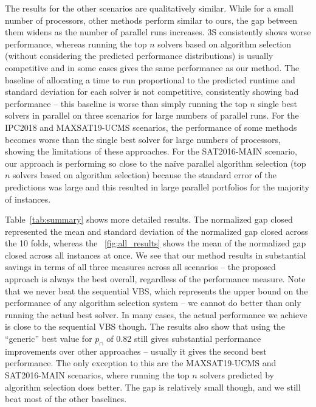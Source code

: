 The results for the other scenarios are qualitatively similar. While for a small number of processors, other methods perform similar to ours, the gap between them widens as the number of parallel runs increases. 3S consistently shows worse performance, whereas running the top $n$ solvers based on algorithm selection (without considering the predicted performance distributions) is usually competitive and in some cases gives the same performance as our method. The baseline of allocating a time to run proportional to the predicted runtime and standard deviation for each solver is not competitive, consistently showing bad performance -- this baseline is worse than simply running the top $n$ single best solvers in parallel on three scenarios for large numbers of parallel runs. For the IPC2018 and MAXSAT19-UCMS scenarios, the performance of some methods becomes worse than the single best solver for large numbers of processors, showing the limitations of these approaches. For the SAT2016-MAIN scenario, our approach is performing so close to the na\"ive parallel algorithm selection (top $n$ solvers based on algorithm selection) because the standard error of the predictions was large and this resulted in large parallel portfolios for the majority of instances.

Table~\ref{tab:summary} shows more detailed results. The normalized gap closed represented the mean and standard deviation of the normalized gap closed across the 10 folds, whereas the ~\ref{fig:all_results} shows the mean of the normalized gap closed across all instances at once. We see that our method results in substantial savings in terms of all three measures across all scenarios -- the proposed approach is always the best overall, regardless of the performance measure. Note that we never beat the sequential VBS, which represents the upper bound on the performance of any algorithm selection system -- we cannot do better than only running the actual best solver. In many cases, the actual performance we achieve is close to the sequential VBS though. The results also show that using the ``generic'' best value for $p_{\cap}$ of 0.82 still gives substantial performance improvements over other approaches -- usually it gives the second best performance. The only exception to this are the MAXSAT19-UCMS and SAT2016-MAIN scenarios, where running the top $n$ solvers predicted by algorithm selection does better. The gap is relatively small though, and we still beat most of the other baselines.

